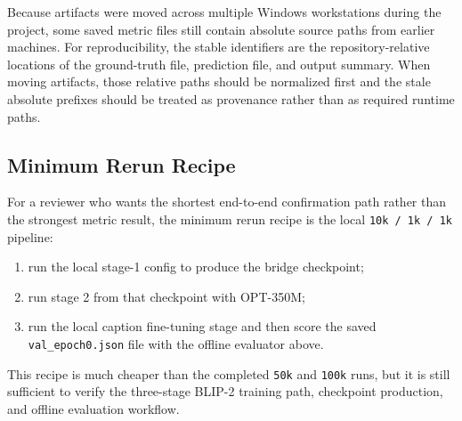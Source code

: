 \documentclass[11pt]{article}
\begin{document}
Because artifacts were moved across multiple Windows workstations during the project, some saved metric files still contain absolute source paths from earlier machines. For reproducibility, the stable identifiers are the repository-relative locations of the ground-truth file, prediction file, and output summary. When moving artifacts, those relative paths should be normalized first and the stale absolute prefixes should be treated as provenance rather than as required runtime paths.

\subsection{Minimum Rerun Recipe}
For a reviewer who wants the shortest end-to-end confirmation path rather than the strongest metric result, the minimum rerun recipe is the local \texttt{10k / 1k / 1k} pipeline:
\begin{enumerate}
\item run the local stage-1 config to produce the bridge checkpoint;
\item run stage 2 from that checkpoint with OPT-350M;
\item run the local caption fine-tuning stage and then score the saved \texttt{val\_epoch0.json} file with the offline evaluator above.
\end{enumerate}
This recipe is much cheaper than the completed \texttt{50k} and \texttt{100k} runs, but it is still sufficient to verify the three-stage BLIP-2 training path, checkpoint production, and offline evaluation workflow.


\end{document}
